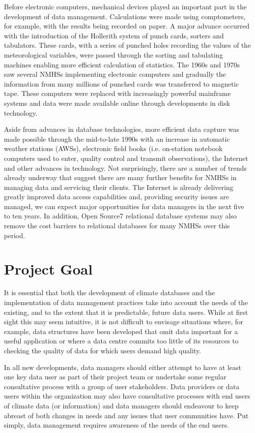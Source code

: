 Before electronic computers, mechanical devices played an important part in the
development of data management. Calculations were made using comptometers, for
example, with the results being recorded on paper. A major advance occurred with
the introduction of the Hollerith system of punch cards, sorters and tabulators.
These cards, with a series of punched holes recording the values of the
meteorological variables, were passed through the sorting and tabulating
machines enabling more efficient calculation of statistics. The 1960s and 1970s
saw several NMHSs implementing electronic computers and gradually the
information from many millions of punched cards was transferred to magnetic
tape. These computers were replaced with increasingly powerful mainframe systems
and data were made available online through developments in disk technology.

Aside from advances in database technologies, more efficient data capture was
made possible through the mid-to-late 1990s with an increase in automatic
weather stations (AWSs), electronic field books (i.e. on-station notebook
computers used to enter, quality control and transmit observations), the
Internet and other advances in technology. Not surprisingly, there are a number
of trends already underway that suggest there are many further benefits for
NMHSs in managing data and servicing their clients. The Internet is already
delivering greatly improved data access capabilities and, providing security
issues are managed, we can expect major opportunities for data managers in the
next five to ten years. In addition, Open Source7 relational database systems
may also remove the cost barriers to relational databases for many NMHSs over
this period.

\section{Project Goal}

It is essential that both the development of climate databases and the
implementation of data management practices take into account the needs of the
existing, and to the extent that it is predictable, future data users. While at
first sight this may seem intuitive, it is not difficult to envisage situations
where, for example, data structures have been developed that omit data important
for a useful application or where a data centre commits too little of its
resources to checking the quality of data for which users demand high quality.

In all new developments, data managers should either attempt to have at least
one key data user as part of their project team or undertake some regular
consultative process with a group of user stakeholders. Data providers or data
users within the organization may also have consultative processes with end
users of climate data (or information) and data managers should endeavour to
keep abreast of both changes in needs and any issues that user communities have.
Put simply, data management requires awareness of the needs of the end users.

